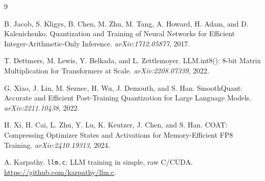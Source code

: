 \documentclass{article}
\begin{document}
\begin{thebibliography}{9}

B. Jacob, S. Kligys, B. Chen, M. Zhu, M. Tang, A. Howard, H. Adam, and
D. Kalenichenko.
\newblock Quantization and Training of Neural Networks for Efficient Integer-Arithmetic-Only Inference.
\newblock \emph{arXiv:1712.05877}, 2017.

T. Dettmers, M. Lewis, Y. Belkada, and L. Zettlemoyer.
\newblock LLM.int8(): 8-bit Matrix Multiplication for Transformers at Scale.
\newblock \emph{arXiv:2208.07339}, 2022.

G. Xiao, J. Lin, M. Seznec, H. Wu, J. Demouth, and S. Han.
\newblock SmoothQuant: Accurate and Efficient Post-Training Quantization for Large Language Models.
\newblock \emph{arXiv:2211.10438}, 2022.

H. Xi, H. Cai, L. Zhu, Y. Lu, K. Keutzer, J. Chen, and S. Han.
\newblock COAT: Compressing Optimizer States and Activations for Memory-Efficient FP8 Training.
\newblock \emph{arXiv:2410.19313}, 2024.

A. Karpathy.
\newblock \texttt{llm.c}: LLM training in simple, raw C/CUDA.
\newblock \url{https://github.com/karpathy/llm.c}.

\end{thebibliography}
\end{document}
